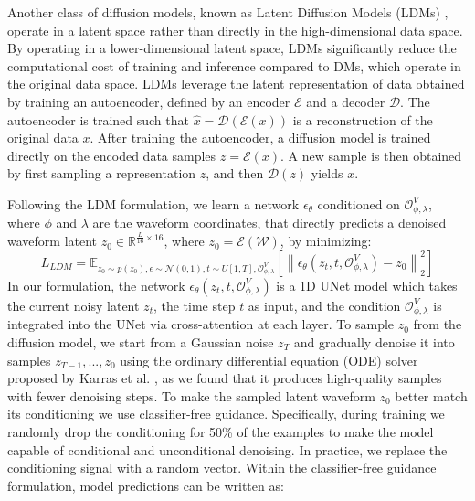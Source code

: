 Another class of diffusion models, known as Latent Diffusion Models (LDMs) \cite{rombach2022sd,shen2023naturalspeech2,ramesh2022hierarchical}, operate in a latent space rather than directly in the high-dimensional data space. By operating in a lower-dimensional latent space, LDMs significantly reduce the computational cost of training and inference compared to DMs, which operate in the original data space.  LDMs leverage the latent representation of data obtained by training an autoencoder, defined by an encoder $\mathcal{E}$ and a decoder $\mathcal{D}$. The autoencoder is trained such that $\hat{x} = \mathcal{D}(\mathcal{E}(x))$ is a reconstruction of the original data $x$. After training the autoencoder, a diffusion model is trained directly on the encoded data samples $z = \mathcal{E}(x)$. A new sample is then obtained by first sampling a representation $z$, and then $\mathcal{D}(z)$ yields $x$. 

Following the LDM formulation, we learn a network $\epsilon_\theta$ conditioned on $\mathcal{O}^V_{\phi,\lambda}$, where $\phi$ and $\lambda$ are the waveform coordinates, that directly predicts a denoised waveform latent $z_0 \in \mathbb{R}^{\frac{L}{16}\times 16}$, where $z_0 = \mathcal{E}(\mathcal{W})$, by minimizing:
\begin{equation}
    \label{eq:cond_ldm}
        L_{LDM} = \mathbb{E}_{z_0 \sim p(z_0), \epsilon \sim \mathcal{N}(0,1), t\sim U[1,T],\mathcal{O}^V_{\phi,\lambda}} \left[ \left\|\epsilon_\theta(z_t, t,\mathcal{O}^V_{\phi,\lambda})-z_0 \right\|_2^2 \right]
\end{equation}
In our formulation, the network $\epsilon_\theta(z_t,t,\mathcal{O}^V_{\phi,\lambda})$ is a 1D UNet model which takes the current noisy latent $z_t$, the time step $t$ as input, and the condition $\mathcal{O}^V_{\phi,\lambda}$ is integrated into the UNet via cross-attention at each layer. 
To sample $z_0$ from the diffusion model, we start from a Gaussian noise $z_T$ and gradually denoise it into samples $z_{T-1},...,z_0$ using the ordinary differential equation (ODE) solver proposed by Karras et al. , as we found that it produces high-quality samples with fewer denoising steps. 
To make the sampled latent waveform $z_0$ better match its conditioning we use classifier-free guidance. Specifically, during training we randomly drop the conditioning for 50\% of the examples to make the model capable of conditional and unconditional denoising. In practice, we replace the conditioning signal with a random vector. Within the classifier-free guidance formulation, model predictions can be written as:

